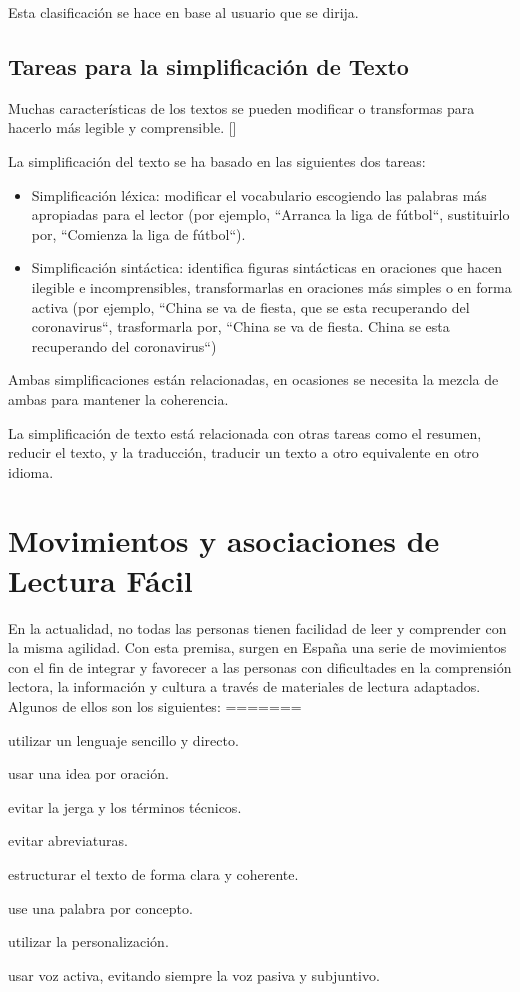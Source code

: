 Esta clasificación se hace en base al usuario que se dirija.

\subsection{Tareas para la simplificación de Texto}
Muchas características de los textos se pueden modificar o transformas para hacerlo más legible y comprensible.
[\cite{HoracioSaggion}]

La simplificación del texto se ha basado en las siguientes dos tareas: 
 \begin{itemize}
<<<<<<< HEAD
 	\item Simplificación léxica: modificar el vocabulario escogiendo las palabras más apropiadas para el lector (por ejemplo, ``Arranca la liga de fútbol``, sustituirlo por, ``Comienza la liga de fútbol``).
 	\item Simplificación sintáctica: identifica figuras sintácticas en oraciones que hacen ilegible e incomprensibles, transformarlas en oraciones más simples o en forma activa (por ejemplo, ``China se va de fiesta, que se esta recuperando del coronavirus``, trasformarla por, ``China se va de fiesta. China se esta recuperando del coronavirus``) 
 	\end{itemize}
 Ambas simplificaciones están relacionadas, en ocasiones se necesita la mezcla de ambas para mantener la coherencia.
 
  \setlength{\parskip}{10pt}
  
 La simplificación de texto está relacionada con otras tareas como el resumen, reducir el texto, y la traducción, traducir un texto a otro equivalente en otro idioma. 



\section{Movimientos y asociaciones de Lectura Fácil}
En la actualidad, no todas las personas tienen facilidad de leer y comprender con la misma agilidad. Con esta premisa, surgen en España una serie de movimientos con el fin de integrar y favorecer a las personas con dificultades en la comprensión lectora, la información y cultura a través de materiales de lectura adaptados. Algunos de ellos son los siguientes:
=======
 	
 	\item utilizar un lenguaje sencillo y directo.
 	\item usar una idea por oración.
 	\item evitar la jerga y los términos técnicos.
 	\item evitar abreviaturas.
 	\item estructurar el texto de forma clara y coherente.
	 \item use una palabra por concepto.
 	\item utilizar la personalización.
 	\item usar voz activa, evitando siempre la voz pasiva y subjuntivo.
 	
